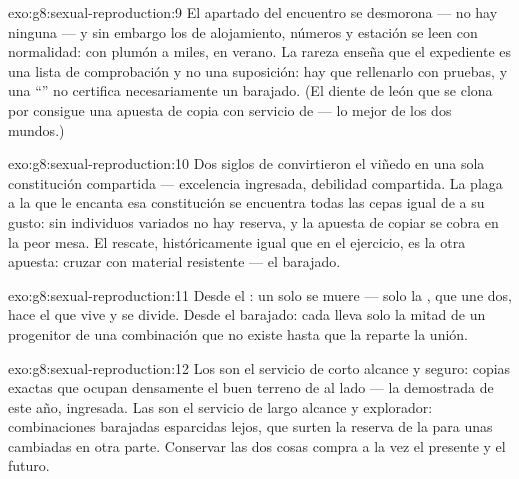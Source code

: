 \begin{solution}{exo:g8:sexual-reproduction:9}
El apartado del encuentro se desmorona --- no hay  ninguna
--- y sin embargo los de alojamiento, números y estación se leen con
normalidad:  con plumón a miles, en verano. La rareza enseña
que el expediente es una lista de comprobación y no una suposición:
hay que rellenarlo con pruebas, y una ``'' no certifica
necesariamente un barajado. (El diente de león que se clona por 
consigue una apuesta de copia con servicio de  --- lo mejor
de los dos mundos.)
\end{solution}

\begin{solution}{exo:g8:sexual-reproduction:10}
Dos siglos de  convirtieron el viñedo en una sola constitución
compartida --- excelencia ingresada, debilidad compartida. La plaga a
la que le encanta esa constitución se encuentra todas las cepas igual
de a su gusto: sin individuos variados no hay reserva, y la apuesta de
copiar se cobra en la peor mesa. El rescate, históricamente igual que
en el ejercicio, es la otra apuesta: cruzar con material resistente ---
el barajado.
\end{solution}

\begin{solution}{exo:g8:sexual-reproduction:11}
Desde el : un  solo se muere --- solo la , que
une dos, hace el  que vive y se divide. Desde el barajado: cada
 lleva solo la mitad de un progenitor de una combinación que no
existe hasta que la reparte la unión.
\end{solution}

\begin{solution}{exo:g8:sexual-reproduction:12}
Los  son el servicio de corto alcance y seguro: copias exactas
que ocupan densamente el buen terreno de al lado --- la 
demostrada de este año, ingresada. Las  son el servicio de
largo alcance y explorador: combinaciones barajadas esparcidas lejos,
que surten la reserva de la  para unas  cambiadas en
otra parte. Conservar las dos cosas compra a la vez el presente y el
futuro.
\end{solution}

